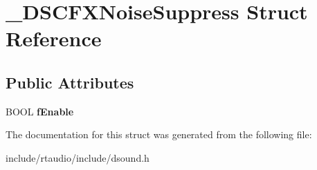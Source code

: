 \hypertarget{struct___d_s_c_f_x_noise_suppress}{}\section{\+\_\+\+D\+S\+C\+F\+X\+Noise\+Suppress Struct Reference}
\label{struct___d_s_c_f_x_noise_suppress}
\subsection*{Public Attributes}
\begin{DoxyCompactItemize}
\item 
B\+O\+OL {\bfseries f\+Enable}\hypertarget{struct___d_s_c_f_x_noise_suppress_acbd23efdcb28085a394214d41a114b7f}{}\label{struct___d_s_c_f_x_noise_suppress_acbd23efdcb28085a394214d41a114b7f}

\end{DoxyCompactItemize}


The documentation for this struct was generated from the following file\+:\begin{DoxyCompactItemize}
\item 
include/rtaudio/include/dsound.\+h\end{DoxyCompactItemize}
